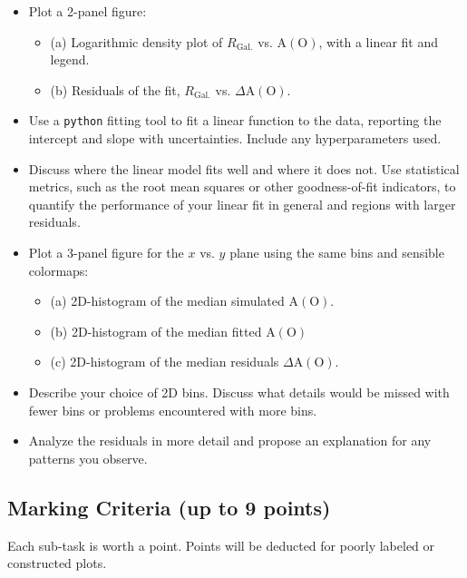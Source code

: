 \documentclass[a4paper,12pt]{article}
\begin{document}
\begin{itemize}
\item Plot a 2-panel figure:
    \begin{itemize}
    \item (a) Logarithmic density plot of $R_\mathrm{Gal.}$ vs. $\mathrm{A(O)}$, with a linear fit and legend.
    \item (b) Residuals of the fit, $R_\mathrm{Gal.}$ vs. $\Delta \mathrm{A(O)}$.
    \end{itemize}
\item Use a \texttt{python} fitting tool to fit a linear function to the data, reporting the intercept and slope with uncertainties. Include any hyperparameters used.
\item Discuss where the linear model fits well and where it does not. Use statistical metrics, such as the root mean squares or other goodness-of-fit indicators, to quantify the performance of your linear fit in general and regions with larger residuals.
\item Plot a 3-panel figure for the $x$ vs. $y$ plane using the same bins and sensible colormaps:
    \begin{itemize}
    \item (a) 2D-histogram of the median simulated $\mathrm{A(O)}$.
    \item (b) 2D-histogram of the median fitted $\mathrm{A(O)}$
    \item (c) 2D-histogram of the median residuals $\Delta \mathrm{A(O)}$.
    \end{itemize}
\item Describe your choice of 2D bins. Discuss what details would be missed with fewer bins or problems encountered with more bins.
\item Analyze the residuals in more detail and propose an explanation for any patterns you observe.
\end{itemize}

\subsection{Marking Criteria (up to 9 points)}

Each sub-task is worth a point. Points will be deducted for poorly labeled or constructed plots.
\end{document}
